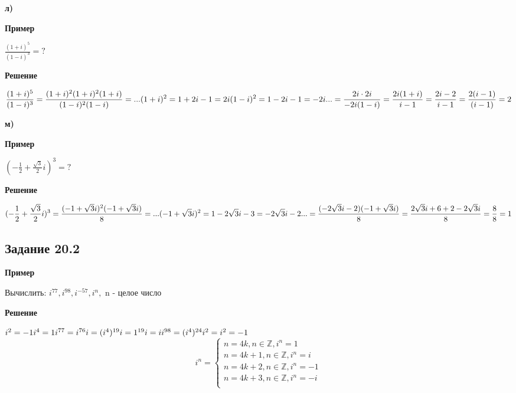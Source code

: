 \documentclass[12pt]{article}
\begin{document}
\newpage
\textbf{л)}\\
\begin{center}\textbf{Пример}\end{center}
$
\displaystyle
\frac{(1+i)^5}{(1-i)^3}=?
$\\
\begin{center}\textbf{Решение}\end{center}
$
\displaystyle
\frac{(1+i)^5}{(1-i)^3}=
\frac{(1+i)^2(1+i)^2(1+i)}{(1-i)^2(1-i)}=...
\\
\\
(1+i)^2 = 1+2i-1=2i\\
(1-i)^2 = 1-2i-1=-2i\\
\\
...=\frac{2i\cdot2i}{-2i(1-i)}=
\frac{2i(1+i)}{i-1}=
\frac{2i-2}{i-1}=
\frac{2(i-1)}{(i-1)}=2
$

\newpage
\textbf{м)}\\
\begin{center}\textbf{Пример}\end{center}
$
\displaystyle
(-\frac{1}{2} +\frac{\sqrt3}{2}i)^3=?
$\\
\begin{center}\textbf{Решение}\end{center}
$
\displaystyle
(-\frac{1}{2} +\frac{\sqrt3}{2}i)^3=
\frac{(-1+\sqrt3i)^2(-1+\sqrt3i)}{8}=...\\
\\
(-1+\sqrt3i)^2=1-2\sqrt3i-3=-2\sqrt3i-2\\
\\
...=\frac{(-2\sqrt3i-2)(-1+\sqrt3i)}{8}=
\frac{2\sqrt3i+6+2-2\sqrt3i}{8}=
\frac{8}{8}=1
$

\newpage
\subsection{Задание 20.2}

\begin{center}\textbf{Пример}\end{center}
Вычислить: 
$
i^{77}, i^{98}, i^{-57}, i^n,
$ n  - целое число
\begin{center}\textbf{Решение}\end{center}
$
i^2=-1\\
i^4=1\\
i^{77}=i^{76}i=(i^4)^{19}i=1^{19}i=i\\
i^{98}=(i^4)^{24}i^2=i^2=-1\\
$
\begin{equation*}
i^n= 
 \begin{cases}
n = 4k,n \in \mathbb {Z}, i^n = 1\\
n = 4k+1,n \in \mathbb {Z}, i^n = i\\
n = 4k+2,n \in \mathbb {Z}, i^n = -1\\
n = 4k+3,n \in \mathbb {Z}, i^n = -i\\   
 \end{cases}
\end{equation*}
\end{document}
